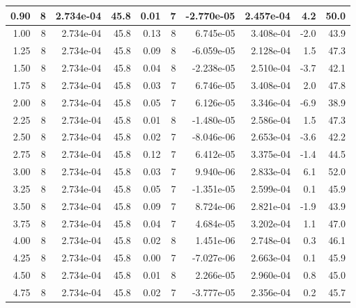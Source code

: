 \begin{tabular}{rrrrrrrrrr}
0.90 &  8 &  2.734e-04 &  45.8 &  0.01 &  7 &  -2.770e-05 &  2.457e-04 &  4.2 &  50.0\\ 
\hline
 1.00 &  8 &  2.734e-04 &  45.8 &  0.13 &  8 &  6.745e-05 &  3.408e-04 &  -2.0 &  43.9\\ 
1.25 &  8 &  2.734e-04 &  45.8 &  0.09 &  8 &  -6.059e-05 &  2.128e-04 &  1.5 &  47.3\\ 
1.50 &  8 &  2.734e-04 &  45.8 &  0.04 &  8 &  -2.238e-05 &  2.510e-04 &  -3.7 &  42.1\\ 
1.75 &  8 &  2.734e-04 &  45.8 &  0.03 &  7 &  6.746e-05 &  3.408e-04 &  2.0 &  47.8\\ 
2.00 &  8 &  2.734e-04 &  45.8 &  0.05 &  7 &  6.126e-05 &  3.346e-04 &  -6.9 &  38.9\\ 
2.25 &  8 &  2.734e-04 &  45.8 &  0.01 &  8 &  -1.480e-05 &  2.586e-04 &  1.5 &  47.3\\ 
2.50 &  8 &  2.734e-04 &  45.8 &  0.02 &  7 &  -8.046e-06 &  2.653e-04 &  -3.6 &  42.2\\ 
2.75 &  8 &  2.734e-04 &  45.8 &  0.12 &  7 &  6.412e-05 &  3.375e-04 &  -1.4 &  44.5\\ 
3.00 &  8 &  2.734e-04 &  45.8 &  0.03 &  7 &  9.940e-06 &  2.833e-04 &  6.1 &  52.0\\ 
3.25 &  8 &  2.734e-04 &  45.8 &  0.05 &  7 &  -1.351e-05 &  2.599e-04 &  0.1 &  45.9\\ 
3.50 &  8 &  2.734e-04 &  45.8 &  0.09 &  7 &  8.724e-06 &  2.821e-04 &  -1.9 &  43.9\\ 
3.75 &  8 &  2.734e-04 &  45.8 &  0.04 &  7 &  4.684e-05 &  3.202e-04 &  1.1 &  47.0\\ 
4.00 &  8 &  2.734e-04 &  45.8 &  0.02 &  8 &  1.451e-06 &  2.748e-04 &  0.3 &  46.1\\ 
4.25 &  8 &  2.734e-04 &  45.8 &  0.00 &  7 &  -7.027e-06 &  2.663e-04 &  0.1 &  45.9\\ 
4.50 &  8 &  2.734e-04 &  45.8 &  0.01 &  8 &  2.266e-05 &  2.960e-04 &  0.8 &  45.0\\ 
4.75 &  8 &  2.734e-04 &  45.8 &  0.02 &  7 &  -3.777e-05 &  2.356e-04 &  0.2 &  45.7\\ 
\hline
 \end{tabular}
